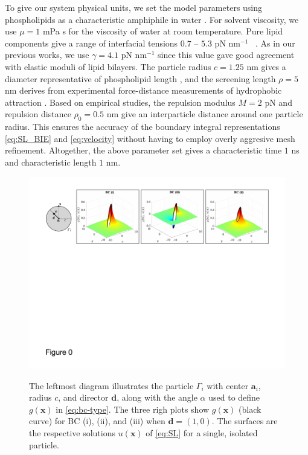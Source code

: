 \documentclass[prb,preprint,showpacs,preprintnumbers,amsmath,amssymb,longbibliography]{revtex4-1}
\renewcommand{\aa}{\mathbf{a}}
\newcommand{\dd}{\mathbf{d}}
\newcommand{\xx}{\mathbf{x}}
\begin{document}
To give our system physical units, we set the model parameters
using phospholipids as a characteristic amphiphile in water \cite{Boal}.
For solvent viscosity, we use $\mu = 1$ mPa s for the viscosity
of water at room temperature.
Pure lipid components give a range
of interfacial tensions $0.7$ -- $5.3$ pN nm$^{-1}$
~\cite{KUZMIN2005, Petelska2012,Jackson2016,GarciaSaez}.
As in our previous works\cite{Fu20,Fu2022_JFM},
we use $\gamma=4.1$ pN nm$^{-1}$ since this value gave
good agreement with elastic moduli of lipid bilayers.
The particle radius $c = 1.25$ nm
gives a diameter representative of phospholipid length \cite{Boal},
and the screening length $\rho = 5$ nm
derives from experimental force-distance measurements of hydrophobic
attraction \cite{ErLjCl89,Lietal05,Israelachvili80,Jackson2016}.
Based on empirical studies, the repulsion modulus $M = 2$ pN
and repulsion distance $\rho_0 = 0.5$ nm give an interparticle
distance around one particle radius.  This 
ensures the accuracy of the boundary integral representations
\eqref{eq:SL_BIE} and \eqref{eq:velocity}
without having to employ overly aggresive mesh refinement. 
Altogether, the above parameter set gives
a characteristic time $1$
ns and characteristic length $1$ nm.

\begin{figure}[h!]
\begin{center}
  \includegraphics[width=\textwidth]{Figures/Figure0.pdf}
\end{center}
\begin{caption}{\label{fig:boundary_conditions}
    The leftmost diagram illustrates the particle
    $\Gamma_i$ with center $\aa_i$, radius $c$, and director $\dd$,
    along with the angle $\alpha$ used to define $g(\xx)$ in \eqref{eq:bc-type}.
    The three righ plots show $g(\xx)$ (black curve) for BC (i), (ii), and (iii)
    when $\dd = (1,0)$. The surfaces are the respective solutions
    $u(\xx)$ of \eqref{eq:SL} for a single, isolated particle.  
  }
\end{caption}
\end{figure}
\end{document}
